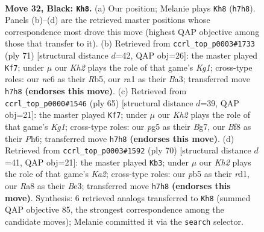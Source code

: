 \documentclass[11pt]{article}
\begin{document}
\clearpage

\begin{figure}[p]\centering
\begin{subfigure}{0.46\textwidth}\centering
\resizebox{\linewidth}{!}{%
\newchessgame
\chessboard[
  setfen={r4b2/p6k/2N3p1/PP4P1/5P2/2N5/8/R1B1K3 b Q - 0 32},
  showmover=false,
  pgfstyle=straightmove, color=movearrow, markmove={h7-h8}
]}
\caption{}
\end{subfigure}\hfill
\begin{subfigure}{0.46\textwidth}\centering
\resizebox{\linewidth}{!}{%
\newchessgame
\chessboard[
  setfen={6k1/6p1/5p2/pr6/7P/bPR1BP1K/5P2/8 b - - 3 36},
  showmover=false,
  pgfstyle=straightmove, color=movearrow, markmove={g8-f7}
]}
\caption{}
\end{subfigure}
\\[4pt]
\begin{subfigure}{0.46\textwidth}\centering
\resizebox{\linewidth}{!}{%
\newchessgame
\chessboard[
  setfen={6k1/6b1/7p/5pp1/8/3P1N1P/3R1PPK/1r6 b - - 5 33},
  showmover=false,
  pgfstyle=straightmove, color=movearrow, markmove={g8-f7}
]}
\caption{}
\end{subfigure}\hfill
\begin{subfigure}{0.46\textwidth}\centering
\resizebox{\linewidth}{!}{%
\newchessgame
\chessboard[
  setfen={3b4/3B1pk1/R2P2p1/4p3/8/3nBP2/KP6/3r4 w - - 2 36},
  showmover=false,
  pgfstyle=straightmove, color=movearrow, markmove={a2-b3}
]}
\caption{}
\end{subfigure}
\caption{\textbf{Move 32, Black: \texttt{Kh8}.} (a) Our position; Melanie plays \texttt{Kh8} (\texttt{h7h8}). Panels (b)--(d) are the retrieved master positions whose correspondence most drove this move (highest QAP objective among those that transfer to it). (b) Retrieved from \texttt{ccrl\_top\_p0003\#1733} (ply 71) [structural distance $d$=42, QAP obj=26]: the master played \texttt{Kf7}; under $\mu$ our \emph{Kh2} plays the role of that game's \emph{Kg1}; cross-type roles: our \emph{n}c6 as their \emph{R}b5, our \emph{r}a1 as their \emph{B}a3; transferred move \texttt{h7h8} \textbf{(endorses this move)}. (c) Retrieved from \texttt{ccrl\_top\_p0000\#1546} (ply 65) [structural distance $d$=39, QAP obj=21]: the master played \texttt{Kf7}; under $\mu$ our \emph{Kh2} plays the role of that game's \emph{Kg1}; cross-type roles: our \emph{p}g5 as their \emph{B}g7, our \emph{B}f8 as their \emph{P}h6; transferred move \texttt{h7h8} \textbf{(endorses this move)}. (d) Retrieved from \texttt{ccrl\_top\_p0003\#1592} (ply 70) [structural distance $d$=41, QAP obj=21]: the master played \texttt{Kb3}; under $\mu$ our \emph{Kh2} plays the role of that game's \emph{Ka2}; cross-type roles: our \emph{p}b5 as their \emph{r}d1, our \emph{R}a8 as their \emph{B}e3; transferred move \texttt{h7h8} \textbf{(endorses this move)}. Synthesis: 6 retrieved analogs transferred to \texttt{Kh8} (summed QAP objective 85, the strongest correspondence among the candidate moves); Melanie committed it via the \texttt{search} selector.}
\label{fig:thought-m63}
\end{figure}
\end{document}
